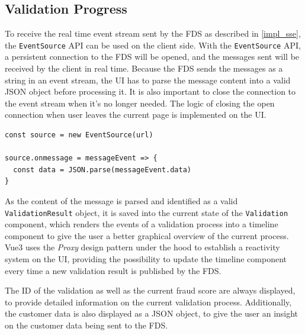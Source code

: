   \subsection{Validation Progress}
  
    To receive the real time event stream sent by the FDS as described in \autoref{impl_sse}, the \verb;EventSource; API can be used on the client side. With the \verb;EventSource; API, a persistent connection to the FDS will be opened, and the messages sent will be received by the client in real time. Because the FDS sends the messages as a string in an event stream, the UI has to parse the message content into a valid JSON object before processing it. It is also important to close the connection to the event stream when it's no longer needed. The logic of closing the open connection when user leaves the current page is implemented on the UI. 

    \begin{lstlisting}[style=es6, caption={Using the EventSource API in the browser (TypeScript)}]
const source = new EventSource(url)

source.onmessage = messageEvent => {
  const data = JSON.parse(messageEvent.data)
}
\end{lstlisting}

    As the content of the message is parsed and identified as a valid \verb;ValidationResult; object, it is saved into the current state of the \verb;Validation; component, which renders the events of a validation process into a timeline component to give the user a better graphical overview of the current process. Vue3 uses the \emph{Proxy}\autocite[pp. 207-217]{gamma-1995} design pattern under the hood to establish a reactivity system on the UI, providing the possibility to update the timeline component every time a new validation result is published by the FDS. 

    The ID of the validation as well as the current fraud score are always displayed, to provide detailed information on the current validation process. Additionally, the customer data is also displayed as a JSON object, to give the user an insight on the customer data being sent to the FDS. 

